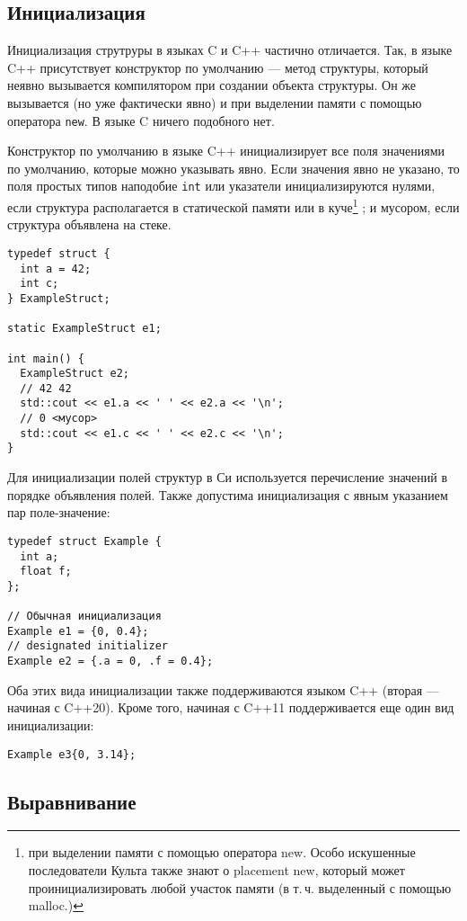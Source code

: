 \subsection{Инициализация}

Инициализация струтруры в языках C и C++ частично отличается. Так, в языке C++
присутствует конструктор по умолчанию --- метод структуры, который неявно
вызывается компилятором при создании объекта структуры. Он же вызывается (но
уже фактически явно) и при выделении памяти с помощью оператора \verb|new|.
В языке C ничего подобного нет.

Конструктор по умолчанию в языке C++ инициализирует все поля значениями по
умолчанию, которые можно указывать явно. Если значения явно не указано, то
поля простых типов наподобие \verb|int| или указатели инициализируются нулями,
если структура располагается в статической памяти или в куче\footnote{при
выделении памяти с помощью оператора new. Особо искушенные последователи Культа
также знают о placement new, который может проинициализировать любой участок памяти (в
т.\,ч. выделенный с помощью malloc.)}
; и мусором, если
структура объявлена на стеке.
\begin{verbatim}
typedef struct {
  int a = 42;
  int c;
} ExampleStruct;

static ExampleStruct e1;

int main() {
  ExampleStruct e2;
  // 42 42
  std::cout << e1.a << ' ' << e2.a << '\n';
  // 0 <мусор>
  std::cout << e1.c << ' ' << e2.c << '\n';
}
\end{verbatim}

Для инициализации полей структур в Си используется перечисление значений
в порядке объявления полей. Также допустима инициализация с явным указанием
пар поле-значение:
\begin{verbatim}
typedef struct Example {
  int a;
  float f;
};

// Обычная инициализация
Example e1 = {0, 0.4};
// designated initializer
Example e2 = {.a = 0, .f = 0.4};
\end{verbatim}

Оба этих вида инициализации также поддерживаются языком C++ (вторая --- начиная с C++20).
Кроме того, начиная с C++11 поддерживается еще один вид инициализации:
\begin{verbatim}
Example e3{0, 3.14};
\end{verbatim}

\subsection{Выравнивание}

